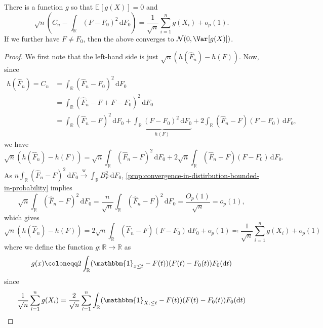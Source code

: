 \begin{proposition}\label{prop:Cramer-von Mises}
	There is a function \(g\) so that \(\mathbb{E}_{}[g(X)] = 0\) and
	\[
		\sqrt{n} \left( C_n - \int _\mathbb{R} (F - F_0)^2 \,\mathrm{d} F_0 \right)
		= \frac{1}{\sqrt{n} } \sum_{i=1}^{n} g(X_i) + o_p(1).
	\]
	If we further have \(F \neq F_0\), then the above converges to \(\mathcal{N} (0, \Var_{}[g(X)] )\).
\end{proposition}
\begin{proof}
	We first note that the left-hand side is just \(\sqrt{n} (h(\hat{F} _n) - h(F))\). Now, since
	\[
		\begin{split}
			h(\hat{F} _n)
			= C_n
			 & = \int _\mathbb{R} (\hat{F} _n - F_0)^2 \,\mathrm{d} F_0                                                                                                                                     \\
			 & = \int _\mathbb{R} (\hat{F} _n - F + F - F_0)^2 \,\mathrm{d} F_0                                                                                                                             \\
			 & = \int _\mathbb{R} (\hat{F} _n - F)^2 \,\mathrm{d} F_0 + \underbrace{\int _\mathbb{R} (F - F_0)^2 \,\mathrm{d} F_0}_{h(F)} + 2 \int _\mathbb{R} (\hat{F} _n - F) (F - F_0) \,\mathrm{d} F_0,
		\end{split}
	\]
	we have
	\[
		\sqrt{n} \left( h(\hat{F} _n) - h(F) \right)
		= \sqrt{n} \int _\mathbb{R} (\hat{F} _n - F)^2 \,\mathrm{d} F_0 + 2 \sqrt{n} \int _\mathbb{R} (\hat{F} _n - F) (F - F_0) \,\mathrm{d} F_0.
	\]
	As \(n \int _\mathbb{R} (\hat{F} _n - F)^2 \,\mathrm{d} F_0 \overset{\text{w} }{\to} \int _\mathbb{R} B_F^2 \,\mathrm{d} F_0\), \autoref{prop:convergence-in-distirbution-bounded-in-probability} implies
	\[
		\sqrt{n} \int _\mathbb{R} (\hat{F} _n - F)^2 \,\mathrm{d} F_0
		= \frac{n}{\sqrt{n} } \int _\mathbb{R} (\hat{F} _n - F)^2 \,\mathrm{d} F_0
		= \frac{O_p(1)}{\sqrt{n} }
		= o_p(1),
	\]
	which gives
	\[
		\sqrt{n} \left( h(\hat{F} _n) - h(F) \right)
		= 2 \sqrt{n} \int _\mathbb{R} (\hat{F} _n - F) (F - F_0) \,\mathrm{d} F_0 + o_p(1)
		\eqqcolon \frac{1}{\sqrt{n} } \sum_{i=1}^{n} g(X_i) + o_p(1)
	\]
	where we define the function \(g \colon \mathbb{R} \to \mathbb{R} \) as
	\[
		g(x)
		\coloneqq 2 \int _\mathbb{R} (\mathbbm{1}_{x \leq t} - F(t)) (F(t) - F_0(t)) F_0(\mathrm{d} t)
	\]
	since
	\[
		\begin{split}
			\frac{1}{\sqrt{n} } \sum_{i=1}^{n} g(X_i)
			 & = \frac{2}{\sqrt{n} } \sum_{i=1}^{n} \int _\mathbb{R} (\mathbbm{1}_{X_i \leq t} - F(t)) (F(t) - F_0(t)) F_0(\mathrm{d} t)                                            \\

\end{split}\]
\end{proof}
